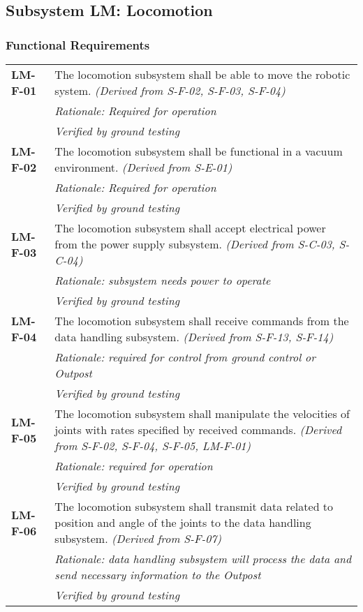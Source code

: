 \subsection{Subsystem LM: Locomotion}
\label{sect:LM_req}
\subsubsection*{Functional Requirements}
\captionsetup[table]{list=no}
\vspace{-15pt}
\begin{longtable}{P{2cm}P{13.75cm}}
\textbf{LM-F-01}	&
The locomotion subsystem shall be able to move the robotic system.
\textit{(Derived from S-F-02, S-F-03, S-F-04)}\\
& \textit{Rationale: Required for operation}	\\
& \textit{Verified by ground testing}	\\
\textbf{LM-F-02}	&
The locomotion subsystem shall be functional in a vacuum environment.
\textit{(Derived from S-E-01)}	\\
& \textit{Rationale: Required for operation}	\\
& \textit{Verified by ground testing}	\\
\textbf{LM-F-03}	& The locomotion subsystem shall accept electrical power from the power supply subsystem.
\textit{(Derived from S-C-03, S-C-04)}	\\
& \textit{Rationale: subsystem needs power to operate}	\\
& \textit{Verified by ground testing}	\\
\textbf{LM-F-04}	& The locomotion subsystem shall receive commands from the data handling subsystem.
\textit{(Derived from S-F-13, S-F-14)}\\ 
& \textit{Rationale: required for control from ground control or Outpost}\\
& \textit{Verified by ground testing}	\\

\textbf{LM-F-05}	&
The locomotion subsystem shall manipulate the velocities of joints with rates specified by received commands.
\textit{(Derived from S-F-02, S-F-04, S-F-05, LM-F-01)}\\
 &	\textit{Rationale: required for operation} \\
 &	\textit{Verified by ground testing}	\\
 
\textbf{LM-F-06}	&
The locomotion subsystem shall transmit data related to position and angle of the joints to the data handling subsystem. \textit{(Derived from S-F-07)} \\
 &	\textit{Rationale: data handling subsystem will process the data and send necessary information to the Outpost} \\
 &	\textit{Verified by ground testing}
\end{longtable}
